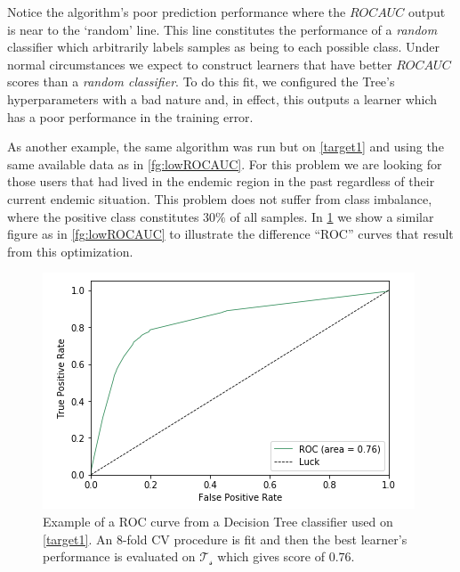 Notice the algorithm's poor prediction performance where the $ROC AUC$ output is near to the `random' line.
This line constitutes the performance of a \textit{random} classifier which arbitrarily labels samples as being to each possible class.
Under normal circumstances we expect to construct learners that have better $ROC AUC$ scores than a \textit{random classifier}.
To do this fit, we configured the Tree's hyperparameters with a bad nature and, in effect, this outputs a learner which has a poor performance in the training error.


As another example, the same algorithm was run but on \cref{target1} and using the same available data as in \cref{fg:lowROCAUC}.
For this problem we are looking for those users that had lived in the endemic region in the past regardless of their current endemic situation.
This problem does not suffer from class imbalance, where the positive class constitutes $30\%$ of all samples.
In \cref{fg:highROCAUC} we show a similar figure as in \cref{fg:lowROCAUC} to illustrate the difference ``ROC'' curves that result from this optimization.

\begin{figure}[h!]
\begin{center}
\includegraphics[width=1\columnwidth]{figures/figure-highROCAUC/figure-highROCAUC}
\caption{Example of a ROC curve from a Decision Tree classifier used on \cref{target1}. An 8-fold CV procedure is fit and then the best learner's performance is evaluated on $\mathcal{T_s}$ which gives score of $0.76$.}
\label{fg:highROCAUC}
\end{center}
\end{figure}

